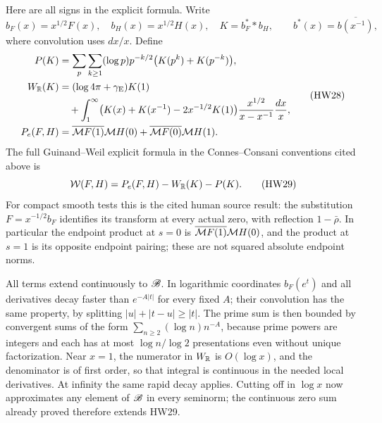 Here are all signs in the explicit formula. Write
\[
 b_F(x)=x^{1/2}F(x),\quad b_H(x)=x^{1/2}H(x),\quad
 K=b_F^**b_H,\qquad b^*(x)=\overline{b(x^{-1})},
 \tag{HW27}
\]
where convolution uses \(dx/x\). Define
\[
 \begin{split}
 P(K)&=\sum_{p}\sum_{k\ge1}(\log p)p^{-k/2}
                          \bigl(K(p^k)+K(p^{-k})\bigr),\\
 W_\mathbb R(K)&=(\log4\pi+\gamma_{\rm E})K(1)\\
 &\quad+\int_1^\infty
  \bigl(K(x)+K(x^{-1})-2x^{-1/2}K(1)\bigr)
               \frac{x^{1/2}}{x-x^{-1}}\frac{dx}{x},\\
 P_e(F,H)&=\overline{\mathcal M F(1)}\mathcal M H(0)
                         +\overline{\mathcal M F(0)}\mathcal M H(1).
 \end{split}
 \tag{HW28}\label{hw:localterms}
\]
The full Guinand--Weil explicit formula in the Connes--Consani
conventions cited above is
\[
 \mathcal W(F,H)=P_e(F,H)-W_\mathbb R(K)-P(K).
 \tag{HW29}\label{hw:explicit}
\]
For compact smooth tests this is the cited human source result:
the substitution \(F=x^{-1/2}b_F\) identifies its transform
at every actual zero, with reflection \(1-\bar\rho\).
In particular the endpoint product at \(s=0\) is
\(\overline{\mathcal M F(1)}\mathcal M H(0)\), and the product at \(s=1\)
is its opposite endpoint pairing; these are not squared
absolute endpoint norms.

All terms extend continuously to \(\mathscr B\).
In logarithmic coordinates \(b_F(e^t)\) and all derivatives
decay faster than \(e^{-A|t|}\) for every fixed \(A\);
their convolution has the same property, by splitting
\(|u|+|t-u|\ge |t|\).
The prime sum is then bounded by convergent sums of the form
\(\sum_{n\ge2}(\log n)n^{-A}\), because prime powers are
integers and each has at most \(\log n/\log2\) presentations
even without unique factorization. Near \(x=1\), the numerator
in \(W_\mathbb R\) is \(O(\log x)\), and the denominator is of
first order, so that integral is continuous in the needed
local derivatives. At infinity the same rapid decay applies.
Cutting off in \(\log x\) now approximates any element of
\(\mathscr B\) in every seminorm; the continuous zero sum already
proved therefore extends HW29.

